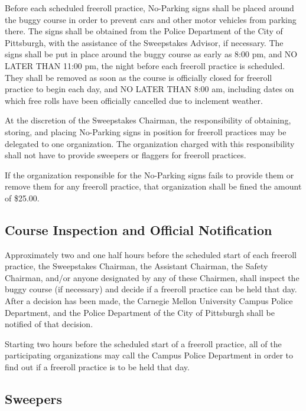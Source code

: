 	Before each scheduled freeroll practice, No-Parking signs shall be placed
	around the buggy course in order to prevent cars and other motor vehicles from
	parking there. The signs shall be obtained from the Police Department of the
	City of Pittsburgh, with the assistance of the Sweepstakes Advisor, if
	necessary. The signs shall be put in place around the buggy course as early as
	8:00 pm, and NO LATER THAN 11:00 pm, the night before each freeroll practice is
	scheduled. They shall be removed as soon as the course is officially closed for
	freeroll practice to begin each day, and NO LATER THAN 8:00 am, including dates
	on which free rolls have been officially cancelled due to inclement weather.

	At the discretion of the Sweepstakes Chairman, the responsibility of obtaining,
	storing, and placing No-Parking signs in position for freeroll practices may be
	delegated to one organization. The organization charged with this
	responsibility shall not have to provide sweepers or flaggers for freeroll
	practices.

	If the organization responsible for the No-Parking signs fails to provide them
	or remove them for any freeroll practice, that organization shall be fined the
	amount of \$25.00.

\subsection{Course Inspection and Official Notification}

	Approximately two and one half hours before the scheduled start of each
	freeroll practice, the Sweepstakes Chairman, the Assistant Chairman, the Safety
	Chairman, and/or anyone designated by any of these Chairmen, shall inspect the
	buggy course (if necessary) and decide if a freeroll practice can be held that
	day. After a decision has been made, the Carnegie Mellon University Campus
	Police Department, and the Police Department of the City of Pittsburgh shall be
	notified of that decision.

	Starting two hours before the scheduled start of a freeroll practice, all of
	the participating organizations may call the Campus Police Department in order
	to find out if a freeroll practice is to be held that day.

\subsection{Sweepers}

